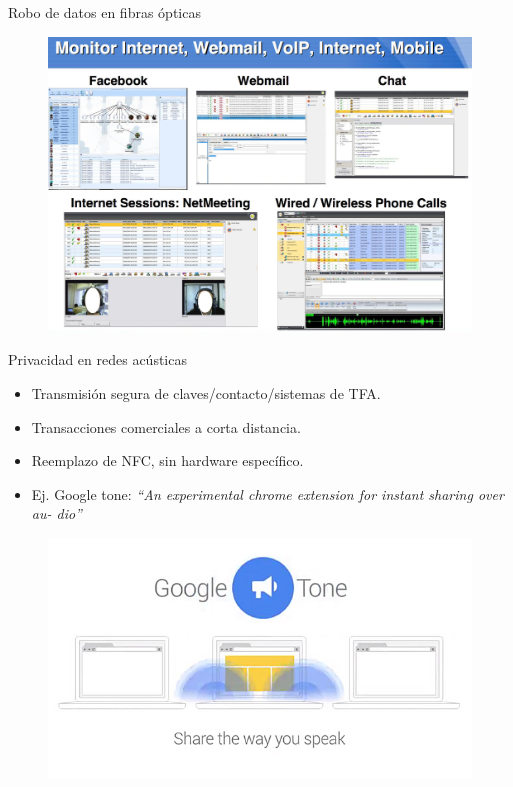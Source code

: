 \documentclass[aspectratio=169]{beamer}
\begin{document}
\begin{frame}{Robo de datos en fibras ópticas}
\begin{figure}[t]
  \centering
  \includegraphics[width=0.80 \textwidth]{graphs/glimmer2.jpg} 
\end{figure}
\end{frame}


\begin{frame}{Privacidad en redes acústicas}

\begin{itemize}
 \item Transmisión segura de claves/contacto/sistemas de TFA.
 \item Transacciones comerciales a corta distancia.
 \item Reemplazo de NFC, sin hardware específico.
 \item Ej. Google tone: \textit{``An experimental chrome extension for instant sharing over au-
dio''}
 \end{itemize}
 
 \begin{figure}[t]
  \centering
  \includegraphics[width=0.65 \textwidth]{graphs/google_tone.jpg} 
\end{figure}
\end{frame}
\end{document}
